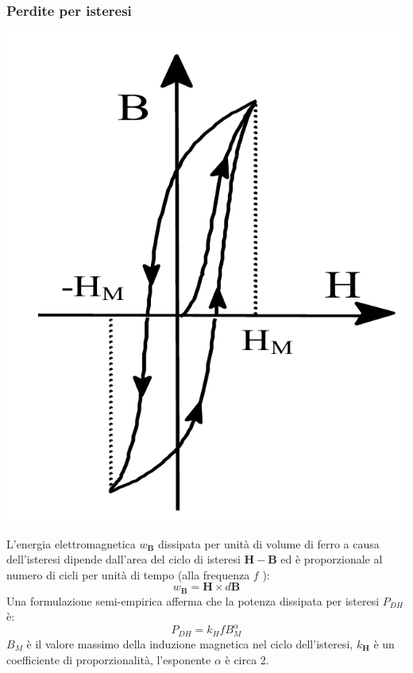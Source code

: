 \documentclass{article}
\begin{document}
\subsubsection*{Perdite per isteresi}
\begin{center}
    \includegraphics[scale=0.24]{Image/Isteresi_ferro.png}
\end{center}
L'energia elettromagnetica $w_{\mathbf{B}}$ dissipata per unità di volume di ferro a causa dell'isteresi dipende dall'area del ciclo di isteresi $\mathbf{H}-\mathbf{B}$ ed è  proporzionale al numero di cicli per unità di tempo (alla frequenza $f$ ):
\[w_{\mathbf{B}} = \mathbf{H} \times d \mathbf{B}\]
Una formulazione semi-empirica afferma che la potenza dissipata per isteresi $P_{DH}$ è:
\[
    P_{DH} = k_H f B_{M}^\alpha
\]
$B_{M}$ è il valore massimo della induzione magnetica nel ciclo dell'isteresi, $k_\mathbf{H}$ è un coefficiente di proporzionalità, l'esponente $\alpha$ è circa 2.
\end{document}
